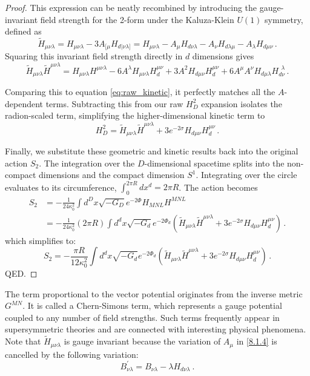 \begin{tcolorbox}[breakable]
\begin{proof}
	This expression can be neatly recombined by introducing the gauge-invariant field strength for the 2-form under the Kaluza-Klein $U(1)$ symmetry, defined as
	\begin{equation}
		\tilde{H}_{\mu\nu\lambda} = H_{\mu\nu\lambda} - 3 A_{[\mu} H_{d|\nu\lambda]} = H_{\mu\nu\lambda} - A_\mu H_{d\nu\lambda} - A_\nu H_{d\lambda\mu} - A_\lambda H_{d\mu\nu} \, .
	\end{equation}
	Squaring this invariant field strength directly in $d$ dimensions gives
	\begin{equation}
		\tilde{H}_{\mu\nu\lambda} \tilde{H}^{\mu\nu\lambda} = H_{\mu\nu\lambda} H^{\mu\nu\lambda} - 6 A^\lambda H_{\mu\nu\lambda} H_d^{\mu\nu} + 3 A^2 H_{d\mu\nu} H_d^{\mu\nu} + 6 A^\mu A^\nu H_{d\mu\lambda} H_{d\nu}^{\ \ \lambda} \, .
	\end{equation}
	
	Comparing this to equation \eqref{eq:raw_kinetic}, it perfectly matches all the $A$-dependent terms. Subtracting this from our raw $H_D^2$ expansion isolates the radion-scaled term, simplifying the higher-dimensional kinetic term to
	\begin{equation}
		H_D^2 = \tilde{H}_{\mu\nu\lambda} \tilde{H}^{\mu\nu\lambda} + 3 e^{-2\sigma} H_{d\mu\nu} H_d^{\mu\nu} \, .
	\end{equation}
	
	Finally, we substitute these geometric and kinetic results back into the original action $S_2$. The integration over the $D$-dimensional spacetime splits into the non-compact dimensions and the compact dimension $S^1$. Integrating over the circle evaluates to its circumference, $\int_0^{2\pi R} dx^d = 2\pi R$. The action becomes
	\begin{align}
		S_2 &= -\frac{1}{24\kappa_0^2} \int d^D x \sqrt{-G_D} e^{-2\Phi} H_{MNL} H^{MNL} \nonumber \\
		&= -\frac{1}{24\kappa_0^2} (2\pi R) \int d^d x \sqrt{-G_d} e^{-2\Phi_d} \left( \tilde{H}_{\mu\nu\lambda} \tilde{H}^{\mu\nu\lambda} + 3 e^{-2\sigma} H_{d\mu\nu} H_d^{\mu\nu} \right) \, .
	\end{align}
	which simplifies to:
	\begin{equation}
		S_2 = -\frac{\pi R}{12\kappa_0^2} \int d^d x \sqrt{-G_d} e^{-2\Phi_d} \left( \tilde{H}_{\mu\nu\lambda} \tilde{H}^{\mu\nu\lambda} + 3 e^{-2\sigma} H_{d\mu\nu} H_d^{\mu\nu} \right) \, .
	\end{equation}
	QED.
	\end{proof}
\end{tcolorbox}
The term proportional to the vector potential originates from the inverse metric $G^{M N} $. It is called a Chern-Simons term, which represents a gauge potential coupled to any number of field strengths. Such terms frequently appear in supersymmetric theories and are connected with interesting physical phenomena.
Note that $\tilde{H}_{\mu \nu \lambda}$ is gauge invariant  because the variation of $A_{\mu}$ in \eqref{8.1.4} is cancelled by the following variation: 
\begin{equation}
	B_{\nu \lambda}^{\prime}=B_{\nu \lambda}-\lambda H_{d \nu \lambda} \:. \label{8.1.15}
\end{equation}

